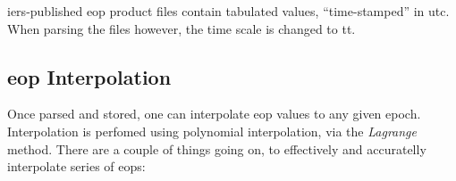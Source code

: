 \begin{warning}
\gls{iers}-published \gls{eop} product files contain tabulated values, ``time-stamped'' 
in \gls{utc}. When parsing the files however, the time scale is changed to \gls{tt}.
\end{warning}

\subsection{\gls{eop} Interpolation}\label{ssec:eop-interpolation}

Once parsed and stored, one can interpolate \gls{eop} values to any given epoch. 
Interpolation is perfomed using polynomial interpolation, via the \emph{Lagrange} method. 
There are a couple of things going on, to effectively and accuratelly interpolate 
series of \glspl{eop}:
